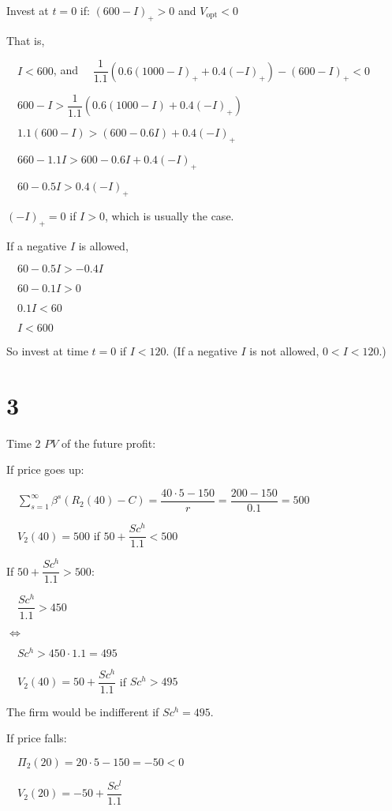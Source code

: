 \documentclass{article}
\begin{document}
Invest at $t=0$ if: $\left(600-I\right)_{+}>0$ and $V_{\text{opt}}<0$

That is,

$\quad I<600$, and $\quad \dfrac{1}{1.1}\left(0.6\left(1000-I\right)_{+}+0.4\left(-I\right)_{+}\right)-\left(600-I\right)_{+}<0$

$\quad 600-I>\dfrac{1}{1.1}\left(0.6\left(1000-I\right)+0.4\left(-I\right)_{+}\right)$

$\quad 1.1\left(600-I\right)>\left(600-0.6I\right)+0.4\left(-I\right)_{+}$

$\quad 660-1.1I>600-0.6I+0.4\left(-I\right)_{+}$

$\quad 60-0.5I>0.4\left(-I\right)_{+}$

$\left(-I\right)_{+}=0$ if $I>0$, which is usually the case.

If a negative $I$ is allowed, 

$\quad 60-0.5I>-0.4I$

$\quad 60-0.1I>0$

$\quad 0.1I<60$

$\quad I<600$

So invest at time $t=0$ if $I<120$. (If a negative $I$ is not allowed, $0<I<120$.)

\section*{3}

Time 2 $PV$  of the future profit:

If price goes up:

$\quad\displaystyle \sum^{\infty}_{s=1}\beta^{s}\left(R_{2}\left(40\right)-C\right)=\dfrac{40\cdot5-150}{r}=\dfrac{200-150}{0.1}=500$

$\quad V_{2}\left(40\right)=500$ if $50+\dfrac{Sc^{h}}{1.1}<500$

If $50+\dfrac{Sc^{h}}{1.1}>500$:

$\quad \dfrac{Sc^{h}}{1.1}>450$

$\iff$

$\quad Sc^{h}>450\cdot1.1=495$

$\quad V_{2}\left(40\right)=50+\dfrac{Sc^{h}}{1.1}$ if $Sc^{h}>495$

The firm would be indifferent if $Sc^{h}=495$.

If price falls:

$\quad \Pi_{2}\left(20\right)=20\cdot5-150=-50<0$

$\quad V_{2}\left(20\right)=-50+\dfrac{Sc^{l}}{1.1}$
\end{document}

